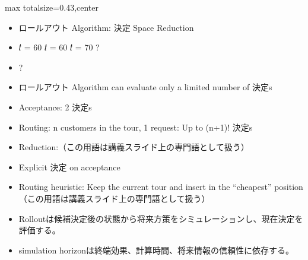 \clearpage
{}
\begin{minipage}[t]{0.405\textwidth}
\begin{adjustbox}{max totalsize={\textwidth}{0.43\textheight},center}
\begin{minipage}{\textwidth}\scriptsize
{}\begin{itemize}
\item ロールアウト Algorithm: 決定 Space Reduction
\item 𝑡 = 60 𝑡 = 60 𝑡 = 70 ?
\item ?
\item ロールアウト Algorithm can evaluate only a limited number of 決定s
\item Acceptance: 2 決定s
\item Routing: n customers in the tour, 1 request: Up to (n+1)! 決定s
\item Reduction:（この用語は講義スライド上の専門語として扱う）
\item Explicit 決定 on acceptance
\item Routing heuristic: Keep the current tour and insert in the “cheapest” position（この用語は講義スライド上の専門語として扱う）
\end{itemize}\begin{itemize}
\item Rolloutは候補決定後の状態から将来方策をシミュレーションし、現在決定を評価する。
\item simulation horizonは終端効果、計算時間、将来情報の信頼性に依存する。
\end{itemize}
\end{minipage}
\end{adjustbox}
\end{minipage}\hfill
